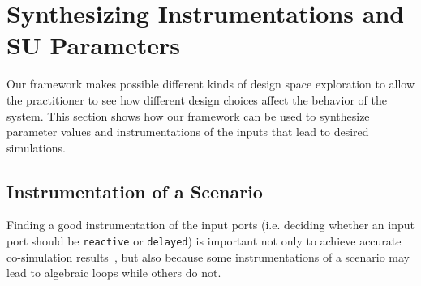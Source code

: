 
\section{Synthesizing Instrumentations and SU
Parameters}\label{sc:DSE} 
Our framework makes possible  different kinds of design space exploration to
allow the %
practitioner to see how different 
design choices affect the behavior of the system. 
This section shows how  our framework can be used to
synthesize parameter values and instrumentations  of the inputs
that lead to desired simulations. 

\subsection{Instrumentation of a Scenario}
Finding a good instrumentation of the input ports (i.e. deciding
whether an input port should be \texttt{reactive} or \texttt{delayed})
is important not only to achieve accurate co-simulation
results~\cite{Gomes2019,Oakes2021,hansen_verification_2021}, but also 
because some instrumentations of a scenario may lead to algebraic
loops while others do not. 


